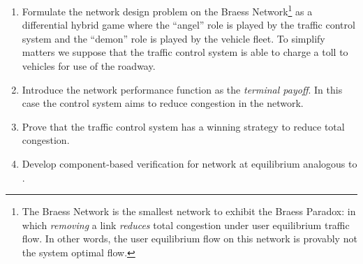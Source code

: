 \begin{enumerate}
    \item Formulate the network design problem on the Braess Network\footnote{The Braess Network \citep{frank1981braess} is the smallest network to exhibit the Braess Paradox: in which \textit{removing} a link \textit{reduces} total congestion under user equilibrium traffic flow. In other words, the user equilibrium flow on this network is provably not the system optimal flow.} as a differential hybrid game where the ``angel'' role is played by the traffic control system and the ``demon'' role is played by the vehicle fleet. To simplify matters we suppose that the traffic control system is able to charge a toll to vehicles for use of the roadway.
    \item Introduce the network performance function as the \textit{terminal payoff}. In this case the control system aims to reduce congestion in the network.
    \item Prove that the traffic control system has a winning strategy to reduce total congestion.
    \item Develop component-based verification for network at equilibrium analogous to \citet{DBLP:conf/itsc/MullerMP15}.
\end{enumerate}